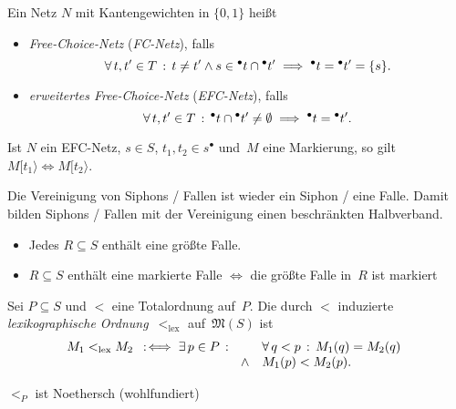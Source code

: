 \documentclass{cheat-sheet}
\newcommand{\preset}[1]{{}^\bullet{#1}} %
\newcommand{\postset}[1]{{#1}^\bullet} %
\newcommand{\activeTransition}[1]{[{#1}\rangle} %
\newcommand{\Markings}{\mathfrak{M}} %
\begin{document}
\begin{defn}
  Ein Netz $N$ mit Kantengewichten in $\{ 0, 1 \}$ heißt
  \begin{itemize}
    \item \emph{Free-Choice-Netz} (\textit{FC-Netz}), falls
    \[
      \fa{t, t' \in T} t \neq t' \wedge s \in \preset{t} \cap \preset{t'} \implies \preset{t} = \preset{t'} = \{ s \}.
    \]
    \item \emph{erweitertes Free-Choice-Netz} (\textit{EFC-Netz}), falls
    \[
      \fa{t, t' \in T} \preset{t} \cap \preset{t'} \neq \emptyset \implies \preset{t} = \preset{t'}.
    \]
  \end{itemize}
\end{defn}

\begin{bem}
  Ist $N$ ein EFC-Netz, $s \in S$, $t_1, t_2 \in \postset{s}$ und~$M$ eine Markierung, so gilt $M \activeTransition{t_1} \iff M \activeTransition{t_2}$.
\end{bem}


\begin{lem}
  Die Vereinigung von Siphons / Fallen ist wieder ein Siphon / eine Falle.
  Damit bilden Siphons / Fallen mit der Vereinigung einen beschränkten Halbverband.
\end{lem}

\begin{kor}
  \begin{itemize}
    \item Jedes $R \subseteq S$ enthält eine größte Falle.
    \item $R \subseteq S$ enthält eine markierte Falle $\iff$ die größte Falle in~$R$ ist markiert
  \end{itemize}
\end{kor}

\begin{defn}
  Sei $P \subseteq S$ und ${<}$ eine Totalordnung auf~$P$.
  Die durch ${<}$ induzierte \emph{lexikographische Ordnung}~${<_\mathrm{lex}}$ auf~$\Markings(S)$ ist
  \[
    M_1 <_\mathrm{lex} M_2 \enspace:\!\iff \exists \, {p \in P} \,:\,
    \begin{array}[t]{r l}
      & \forall \, {q < p} \,:\, M_1(q) = M_2(q) \\
      \wedge & M_1(p) < M_2(p).
    \end{array}
  \]
\end{defn}

\begin{lem}
  $<_P$ ist Noethersch (wohlfundiert)
\end{lem}
\end{document}
